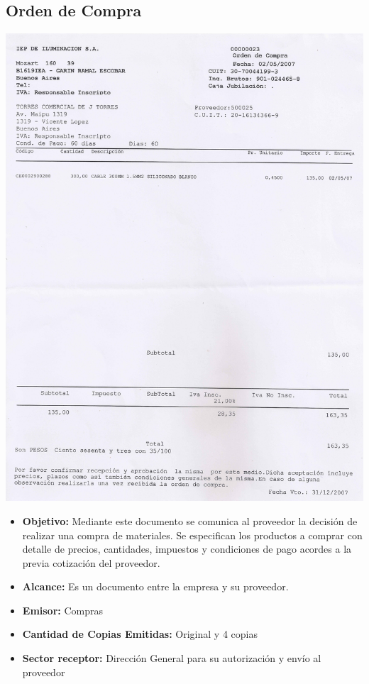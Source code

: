 \subsection{Orden de Compra}
\begin{center}
 \includegraphics[scale=1.6,keepaspectratio=true]{./Images/FormulariosIEP/Orden-de-Compra.png}
\end{center}
\begin{itemize}
  \item \textbf{Objetivo:} Mediante este documento se comunica al proveedor la decisión de realizar una compra de materiales. Se especifican los productos a comprar con detalle de precios, cantidades, impuestos y condiciones de pago acordes a la previa cotización del proveedor.
  \item \textbf{Alcance:} Es un documento entre la empresa y su proveedor.
  \item \textbf{Emisor:} Compras
  \item \textbf{Cantidad de Copias Emitidas:} Original y 4 copias
  \item \textbf{Sector receptor:} Dirección General para su autorización y envío al proveedor
 \end{itemize}
